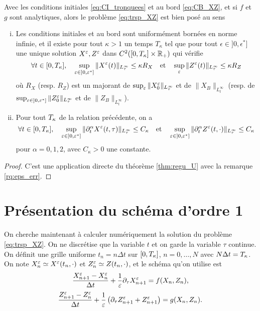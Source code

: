 \begin{theorem} \label{thm:regu_XZ}
Avec les conditions initiales \eqref{eq:CI_tronquees} et au bord \eqref{eq:CB_XZ}, 
et si $f$ et $g$ sont analytiques, alors le problème \eqref{eq:trsp_XZ} est bien posé au sens 
\begin{enumerate}[(i)]
\item Les conditions initiales et au bord sont uniformément bornées en norme infinie, et il existe pour tout $\kappa > 1$ un temps $T_{\kappa}$ tel que pour tout $\epsilon\in]0,\epsilon^*]$ une unique solution $X^{\varepsilon},Z^{\varepsilon}$ dans $C^2([0,T_{\kappa}]\times\mathbb{R}_+)$ qui vérifie 
$$\forall t\in[0,T_{\kappa}],\quad \sup_{\varepsilon\in]0,\varepsilon^*]} \| X^{\varepsilon}(t) \|_{L^{\infty}_{\tau}} \leq \kappa R_X \quad\text{et}\quad \sup_{\varepsilon}\| Z^{\varepsilon}(t) \|_{L^{\infty}_{\tau}} \leq \kappa R_Z $$
où $R_X$ (resp. $R_Z$) est un majorant de $\sup_{\varepsilon}\|X_0^{\varepsilon}\|_{L^{\infty}_{\tau}}$ et de $\|X_B\|_{L^{\infty}_t}$ (resp. de $\sup_{\varepsilon\in]0,\varepsilon^*]}\|Z_0^{\varepsilon}\|_{L^{\infty}_{\tau}}$ et de $\|Z_B\|_{L^{\infty}_t}$). 
\item Pour tout $T_{\kappa}$ de la relation précédente, on a 
$$\forall t\in[0,T_{\kappa}], \quad \sup_{\varepsilon\in]0,\varepsilon^*]} \|\partial_t^{\alpha} X^{\varepsilon}(t,\tau)\|_{L^{\infty}_{\tau}} \leq C_{\kappa} \quad\text{et}\quad \sup_{\varepsilon\in]0,\varepsilon^*]} \|\partial_t^{\alpha} Z^{\varepsilon}(t,\cdot)\|_{L^{\infty}_{\tau}} \leq C_{\kappa} $$
pour $\alpha = 0,1,2$, avec $C_{\kappa} > 0$ une constante. 
\end{enumerate}
\end{theorem}

\begin{proof}
C'est une application directe du théorème \ref{thm:regu_U} avec la remarque \ref{rq:eps_err}. 
\end{proof}


\section{Présentation du schéma d'ordre 1}

On cherche maintenant à calculer numériquement la solution du problème \eqref{eq:trsp_XZ}. On ne discrétise que la variable $t$ et on garde la variable $\tau$ continue. On définit une grille uniforme $t_n = n\Delta t$ sur $[0,T_{\kappa}]$, $n=0,\ldots,N$ avec $N\Delta t = T_{\kappa}$. On note $X_n^{\varepsilon} \simeq X^{\varepsilon}(t_n,\cdot)$ et $Z_n^{\varepsilon} \simeq Z(t_n,\cdot)$, et le schéma qu'on utilise est 
$$ \dfrac{X_{n+1}^{\varepsilon} - X_n^{\varepsilon}}{\Delta t} + \frac{1}{\varepsilon} \partial_{\tau} X_{n+1}^{\varepsilon} = f(X_n,Z_n), $$
$$ \dfrac{Z_{n+1}^{\varepsilon} - Z_n^{\varepsilon}}{\Delta t} + \frac{1}{\varepsilon} \left(\partial_{\tau} Z_{n+1}^{\varepsilon} + Z_{n+1}^{\varepsilon} \right) = g(X_n,Z_n). $$

